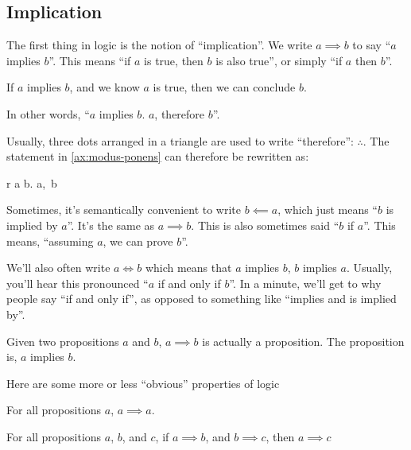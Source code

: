 \subsection{Implication}

The first thing in logic is the notion of ``implication''. We write
$a \implies b$ to say ``$a$ implies $b$''. This means ``if $a$ is
true, then $b$ is also true'', or simply ``if $a$ then $b$''.

\begin{axiom}
  \label{ax:modus-ponens}
  If $a$ implies $b$, and we know $a$ is true, then we can conclude
  $b$.

  In other words, ``$a$ implies $b$. $a$, therefore $b$''.
\end{axiom}

Usually, three dots arranged in a triangle are used to write
``therefore'': $\therefore$.  The statement in \cref{ax:modus-ponens}
can therefore be rewritten as:

\begin{alignmath}{r}
  a \implies b.\; a,\, \therefore b
\end{alignmath}

Sometimes, it's semantically convenient to write $b \impliedby a$,
which just means ``$b$ is implied by $a$''. It's the same as
$a \implies b$. This is also sometimes said ``$b$ if $a$''. This
means, ``assuming $a$, we can prove $b$''.

We'll also often write $a \iff b$ which means that $a$ implies $b$,
 $b$ implies $a$. Usually, you'll hear this pronounced ``$a$
if and only if $b$''. In a minute, we'll get to why people say ``if
and only if'', as opposed to something like ``implies and is implied
by''.

\begin{remark}
  Given two propositions $a$ and $b$, $a \implies b$ is actually a
  proposition. The proposition is, $a$ implies $b$.
\end{remark}

Here are some more or less ``obvious'' properties of logic

\begin{axiom}
  \label{ax:props-refl}
  For all propositions $a$, $a \implies a$.
\end{axiom}

\begin{lemma}
  \label{ax:props-trans}
  For all propositions $a$, $b$, and $c$, if $a \implies b$, and $b
  \implies c$, then $a \implies c$
\end{lemma}

